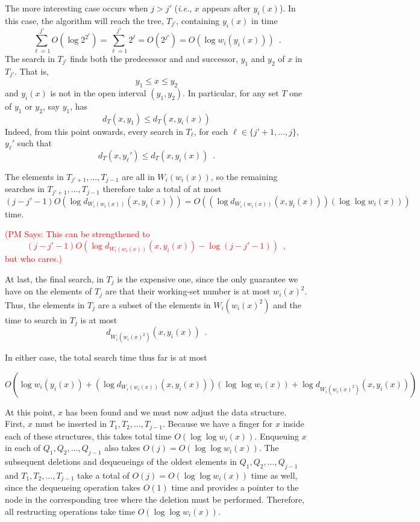 \documentclass{llncs}
\newcommand{\ie}{\textsl{i.e.}}
\newcommand{\BigOh}[1]{O\!\left(#1\right)}
\newcommand{\pat}[1]{\textcolor{red}{(PM Says: #1)}}
\begin{document}
The more interesting case occurs when $j > j'$ (\ie, $x$ appears after $y_i(x)$).  In this case, the algorithm will reach the tree, $T_{j'}$, containing $y_i(x)$ in time 
\[  
    \sum_{\ell=1}^{j'} O(\log 2^{2^\ell})=\sum_{\ell=1}^{j'} 2^\ell = \BigOh{2^{j'}} = \BigOh{\log w_i(y_i(x))}
    \enspace .
\]
The search in $T_{j'}$ finds both the predecessor and and successor, $y_1$ and $y_2$ of $x$ in $T_{j'}$.  That is,
\[
       y_1 \le x \le y_2
\]
and $y_i(x)$ is not in the open interval $(y_1,y_2)$.  In particular,
for any set $T$ one of $y_1$ or $y_2$, say $y_1$, has
\[
    d_{T}(x,y_1) \le d_{T}(x,y_i(x))
\]
Indeed, from this point onwards, every search in $T_{\ell}$, for each $\ell\in\{j'+1,\ldots,j\}$, $y_\ell'$ such that
\[
    d_{T}(x,y_\ell') \le d_{T}(x,y_i(x)) \enspace .
\]

The elements in $T_{j'+1},\ldots,T_{j-1}$ are all in $W_i(w_i(x))$, so
the remaining searches in $T_{j'+1},\ldots,T_{j-1}$ therefore take a total of at most
\[
  (j-j'-1)\BigOh{\log d_{W_i(w_i(x))}(x,y_i(x))}
  =\BigOh{(\log d_{W_i(w_i(x))}(x,y_i(x)))(\log\log w_i(x))}
\]
time.

\pat{This can be strengthened to 
\[
  (j-j'-1)\BigOh{\log d_{W_i(w_i(x))}(x,y_i(x)) - \log (j-j'-1)} \enspace ,
\]
but who cares.}


At last, the final search, in $T_j$ is the expensive one, since the only
guarantee we have on the elements of $T_j$ are that their working-set number
is at most $w_i(x)^2$.  Thus, the elements in $T_j$ are a subset of the elements in $W_i(w_i(x)^2)$ and the time to search in $T_j$ is at most
\[
    d_{W_i(w_i(x)^2)}(x,y_i(x)) \enspace .
\]

In either case, the total search time thus far is at most 

\begin{displaymath}
	\BigOh{\log w_i(y_i(x)) + (\log d_{W_i(w_i(x))}(x,y_i(x)))(\log \log w_i(x)) + \log d_{W_i(w_i(x)^2)}(x,y_i(x))}
\end{displaymath}

At this point, $x$ has been found and we must now adjust the data structure. First, $x$ must be inserted in $T_1,T_2,\ldots,T_{j-1}$. Because we have a finger for $x$ inside each of these structures, this takes total time $\BigOh{\log \log w_i(x)}$. Enqueuing $x$ in each of $Q_1,Q_2,\ldots,Q_{j-1}$ also takes $\BigOh{j} = \BigOh{\log \log w_i(x)}$. The subsequent deletions and dequeueings of the oldest elements in $Q_1,Q_2,\ldots,Q_{j-1}$ and $T_1,T_2,\ldots,T_{j-1}$ take a total of $\BigOh{j} = \BigOh{\log \log w_i(x)}$ time as well, since the dequeueing operation takes $\BigOh{1}$ time and provides a pointer to the node in the corresponding tree where the deletion must be performed. Therefore, all restructing operations take time $\BigOh{\log \log w_i(x)}$.
\end{document}
